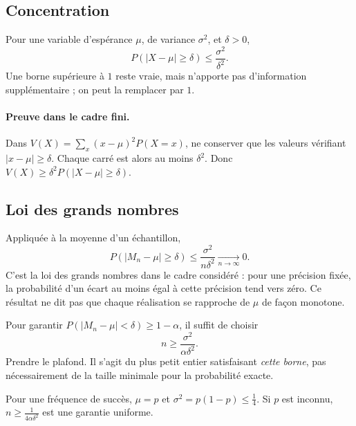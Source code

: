 \subsection{Concentration}
\begin{keypoint}
Pour une variable d'espérance $\mu$, de variance $\sigma^2$, et $\delta>0$,
\[P(|X-\mu|\ge\delta)\le\frac{\sigma^2}{\delta^2}.\]
Une borne supérieure à $1$ reste vraie, mais n'apporte pas d'information supplémentaire ; on peut la remplacer par $1$.
\end{keypoint}
\paragraph{Preuve dans le cadre fini.} Dans $V(X)=\sum_x(x-\mu)^2P(X=x)$, ne conserver que les valeurs vérifiant $|x-\mu|\ge\delta$. Chaque carré est alors au moins $\delta^2$. Donc $V(X)\ge\delta^2P(|X-\mu|\ge\delta)$.
\subsection{Loi des grands nombres}
Appliquée à la moyenne d'un échantillon,
\[P(|M_n-\mu|\ge\delta)\le\frac{\sigma^2}{n\delta^2}\xrightarrow[n\to\infty]{}0.\]
C'est la loi des grands nombres dans le cadre considéré : pour une précision fixée, la probabilité d'un écart au moins égal à cette précision tend vers zéro. Ce résultat ne dit pas que chaque réalisation se rapproche de $\mu$ de façon monotone.
\begin{method}
Pour garantir $P(|M_n-\mu|<\delta)\ge1-\alpha$, il suffit de choisir
\[n\ge\frac{\sigma^2}{\alpha\delta^2}.\]
Prendre le plafond. Il s'agit du plus petit entier satisfaisant \emph{cette borne}, pas nécessairement de la taille minimale pour la probabilité exacte.
\end{method}
Pour une fréquence de succès, $\mu=p$ et $\sigma^2=p(1-p)\le\frac{1}{4}$. Si $p$ est inconnu, $n\ge\frac{1}{4\alpha\delta^2}$ est une garantie uniforme.


\mxnewpage
